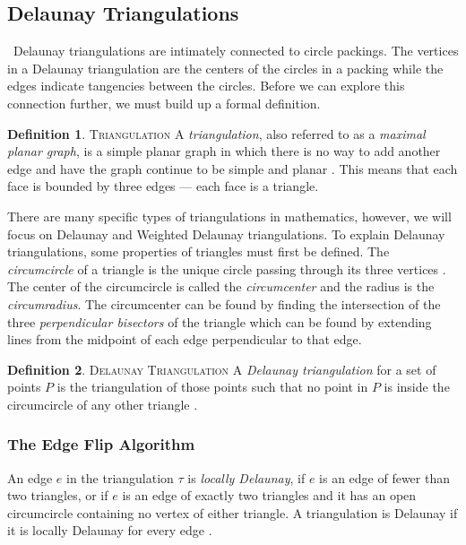 \documentclass[11pt]{article}
\theoremstyle{definition}
\newtheorem{definition}{Definition}[section]
\begin{document}
\subsection{Delaunay Triangulations}\
	Delaunay triangulations are intimately connected to circle packings. 
	The vertices in a Delaunay triangulation are the centers of the circles in a packing while the edges indicate tangencies between the circles. 
	Before we can explore this connection further, we must build up a formal definition.
	
	\theoremstyle{definition}
	\begin{definition}{\textsc{Triangulation}}
		A \emph{triangulation}, also referred to as a \emph{maximal planar graph}, is a simple planar graph in which there is no way to add another edge and have the graph continue to be simple and planar \cite{meshGeneration}. 
		This means that each face is bounded by three edges --- each face is a triangle.
	\end{definition}

	There are many specific types of triangulations in mathematics, however, we will focus on Delaunay and Weighted Delaunay triangulations. 
	To explain Delaunay triangulations, some properties of triangles must first be defined. 
	The \emph{circumcircle} of a triangle is the unique circle passing through its three vertices \cite{mathworld:Circumcenter}. 
	The center of the circumcircle is called the \emph{circumcenter} and the radius is the \emph{circumradius}. 
	The circumcenter can be found by finding the intersection of the three \emph{perpendicular bisectors} of the triangle which can be found by extending lines from the midpoint of each edge perpendicular to that edge.

  	\theoremstyle{definition}
  	\begin{definition}{\textsc{Delaunay Triangulation}}
		A \emph{Delaunay triangulation} for a set of points $P$ is the triangulation of those points such that no point in $P$ is inside the circumcircle of any other triangle \cite{meshGeneration}.
	\end{definition}
	
\subsubsection{The Edge Flip Algorithm}
	An edge $e$ in the triangulation $\tau$ is \emph{locally Delaunay}, if $e$ is an edge of fewer than two triangles, or if $e$ is an edge of exactly two triangles and it has an open circumcircle containing no vertex of either triangle. 
	A triangulation is Delaunay if it is locally Delaunay for every edge \cite{meshGeneration}.
\end{document}
